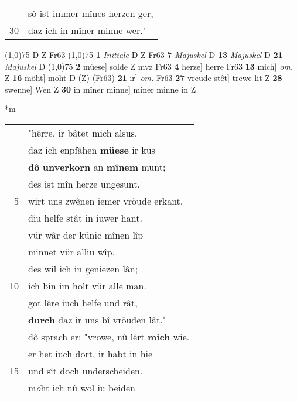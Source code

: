 \documentclass[8pt,a4paper,notitlepage]{article}
\begin{document}
\begin{table}[ht]
\begin{minipage}[t]{0.5\linewidth}
\begin{tabular}{rl}
 & sô ist immer mînes herzen ger,\\ 
30 & daz ich in mîner minne wer."\\ 
\end{tabular}
\scriptsize
\line(1,0){75} \newline
D Z Fr63 \newline
\line(1,0){75} \newline
\textbf{1} \textit{Initiale} D Z Fr63  \textbf{7} \textit{Majuskel} D  \textbf{13} \textit{Majuskel} D  \textbf{21} \textit{Majuskel} D  \newline
\line(1,0){75} \newline
\textbf{2} müese] solde Z mvz Fr63 \textbf{4} herze] herre Fr63 \textbf{13} mich] \textit{om.} Z \textbf{16} möht] moht D (Z) (Fr63) \textbf{21} ir] \textit{om.} Fr63 \textbf{27} vreude stêt] trewe lit Z \textbf{28} swenne] Wen Z \textbf{30} in mîner minne] miner minne in Z \newline
\end{minipage}
\hspace{0.5cm}
\begin{minipage}[t]{0.5\linewidth}
\small
\begin{center}*m
\end{center}
\begin{tabular}{rl}
 & "hêrre, ir bâtet mich alsus,\\ 
 & daz ich enpfâhen \textbf{müese} ir kus\\ 
 & \textbf{dô} \textbf{unverkorn} an \textbf{mînem} munt;\\ 
 & des ist mîn herze ungesunt.\\ 
5 & wirt uns zwênen iemer vröude erkant,\\ 
 & diu helfe stât in iuwer hant.\\ 
 & vür wâr der künic mînen lîp\\ 
 & minnet vür alliu wîp.\\ 
 & des wil ich in geniezen lân;\\ 
10 & ich bin im holt vür alle man.\\ 
 & got lêre iuch helfe und rât,\\ 
 & \textbf{durch} daz ir uns bî vröuden lât."\\ 
 & dô sprach er: "vrowe, nû lêrt \textbf{mich} wie.\\ 
 & er het iuch dort, ir habt in hie\\ 
15 & und sît doch underscheiden.\\ 
 & m\textit{ö}ht ich nû wol iu beiden\\ 

\end{tabular}
\end{minipage}
\end{table}
\end{document}
